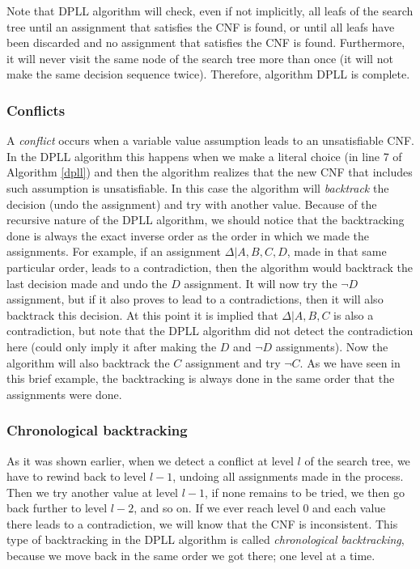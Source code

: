 \documentclass[12pt]{diicc}
\begin{document}
Note that DPLL algorithm will check, even if not implicitly, all leafs of the search tree until an assignment that satisfies the CNF is found, or until all leafs have been discarded and no assignment that satisfies the CNF is found. Furthermore, it will never visit the same node of the search tree more than once (it will not make the same decision sequence twice). Therefore, algorithm DPLL is complete.

\subsubsection{Conflicts}

A \textit{conflict} occurs when a variable value assumption leads to an unsatisfiable CNF. In the DPLL algorithm this happens when we make a literal choice (in line 7 of Algorithm \ref{dpll}) and then the algorithm realizes that the new CNF that includes such assumption is unsatisfiable. In this case the algorithm will \textit{backtrack} the decision (undo the assignment) and try with another value. Because of the recursive nature of the DPLL algorithm, we should notice that the backtracking done is always the exact inverse order as the order in which we made the assignments. For example, if an assignment $\Delta | A,B,C,D$, made in that same particular order, leads to a contradiction, then the algorithm would backtrack the last decision made and undo the $D$ assignment. It will now try the $\neg D$ assignment, but if it also proves to lead to a contradictions, then it will also backtrack this decision. At this point it is implied that $\Delta | A,B,C$ is also a contradiction, but note that the DPLL algorithm did not detect the contradiction here (could only imply it after making the $D$ and $\neg D$ assignments). Now the algorithm will also backtrack the $C$ assignment and try $\neg C$. As we have seen in this brief example, the backtracking is always done in the same order that the assignments were done.

\subsubsection{Chronological backtracking}

As it was shown earlier, when we detect a conflict at level $l$ of the search tree, we have to rewind back to level $l-1$, undoing all assignments made in the process. Then we try another value at level $l-1$, if none remains  to be tried, we then go back further to level $l-2$, and so on. If we ever reach level $0$ and each value there leads to a contradiction, we will know that the CNF is inconsistent. This type of backtracking in the DPLL algorithm is called \textit{chronological backtracking}, because we move back in the same order we got there; one level at a time. 
\end{document}
